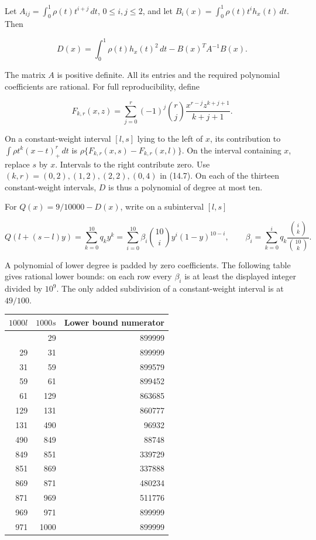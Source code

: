 \documentclass[11pt]{article}
\begin{document}
Let \(A_{ij}=\int_0^1\rho(t)t^{i+j}\,dt\), \(0\le i,j\le2\), and let
\(B_i(x)=\int_0^1\rho(t)t^i h_x(t)\,dt\). Then

\[
D(x)=\int_0^1\rho(t)h_x(t)^2\,dt-B(x)^T A^{-1}B(x).
\tag{14.7}
\]

The matrix \(A\) is positive definite. All its entries and the required
polynomial coefficients are rational. For full reproducibility, define

\[
F_{k,r}(x,z)=\sum_{j=0}^r(-1)^j\binom rj
\frac{x^{r-j}z^{k+j+1}}{k+j+1}.
\tag{14.8}
\]

On a constant-weight interval \([l,s]\) lying to the left of \(x\), its
contribution to \(\int\rho t^k(x-t)_+^r\,dt\) is
\(\rho\{F_{k,r}(x,s)-F_{k,r}(x,l)\}\). On the interval containing \(x\),
replace \(s\) by \(x\). Intervals to the right contribute zero. Use
\((k,r)=(0,2),(1,2),(2,2),(0,4)\) in (14.7). On each of the thirteen
constant-weight intervals, \(D\) is thus a polynomial of degree at most
ten.

For \(Q(x)=9/10000-D(x)\), write on a subinterval \([l,s]\)

\[
Q(l+(s-l)y)=\sum_{k=0}^{10}q_k y^k
=\sum_{i=0}^{10}\beta_i\binom{10}{i}y^i(1-y)^{10-i},\qquad
\beta_i=\sum_{k=0}^i q_k\frac{\binom ik}{\binom{10}k}.
\tag{14.9}
\]

A polynomial of lower degree is padded by zero coefficients. The
following table gives rational lower bounds: on each row every
\(\beta_i\) is at least the displayed integer divided by \(10^9\). The
only added subdivision of a constant-weight interval is at \(49/100\).

{\def\LTcaptype{none} %
\begin{longtable}[]{@{}rrr@{}}
\toprule\noalign{}
\(1000l\) & \(1000s\) & Lower bound numerator \\
\midrule\noalign{}
\endhead
\bottomrule\noalign{}
\endlastfoot
0 & 29 & 899999 \\
29 & 31 & 899999 \\
31 & 59 & 899579 \\
59 & 61 & 899452 \\
61 & 129 & 863685 \\
129 & 131 & 860777 \\
131 & 490 & 96932 \\
490 & 849 & 88748 \\
849 & 851 & 339729 \\
851 & 869 & 337888 \\
869 & 871 & 480234 \\
871 & 969 & 511776 \\
969 & 971 & 899999 \\
971 & 1000 & 899999 \\
\end{longtable}
}
\end{document}
